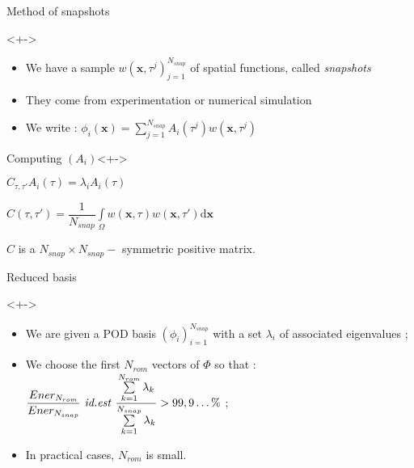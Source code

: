 \begin{frame}{Method of snapshots}
%
\begin{block}{}<+->
\begin{itemize}
\item<+-> We have a sample $w(\mathbf{x},\tau^j)_{j=1}^{N_{snap}}$ of spatial functions, called \emph{snapshots}
\item<+-> They come from experimentation or numerical simulation
\item<+-> We write : $\phi_i(\mathbf{x})=\sum\limits_{j=1}^{N_{snap}}A_i(\tau^j) w(\mathbf{x},\tau^j)$
\end{itemize}
\end{block}
%
\begin{block}{Computing $(A_i)$}<+->%
%
\begin{description}
\item<+-> [Eigenvalue problem] $C_{\tau,\tau'}A_i(\tau)=\lambda_i A_i(\tau)$
\item<+-> [Time-correlation tensor] $C(\tau,\tau ')=\dfrac{1}{N_{snap}}\int\limits_{\Omega} w(\mathbf{x},\tau)w(\mathbf{x},\tau')\text{d}\mathbf{x}$
\item<+-> $C$ is a $N_{snap}\times N_{snap}-$ symmetric positive matrix.
\end{description}
%
\end{block}
%
\end{frame}

\begin{frame}{Reduced basis}
%
\begin{block}{}<+->
\begin{itemize}
\item<+-> We are given a POD basis $(\phi_i)_{i=1}^{N_{snap}}$ with a set $\lambda_i$ of associated eigenvalues ;
\item<+-> We choose the first $N_{rom}$ vectors of $\Phi$ so that : %
$\dfrac{Ener_{N_{rom}}}{Ener_{N_{snap}}}\text{ \textit{id.est} }\dfrac{\sum\limits_{k=1}^{N_{rom}}\lambda_k}{\sum\limits_{k=1}^{N_{snap}}\lambda_k} >99,9\dots \%$ ;
\item<+-> In practical cases, $N_{rom}$ is small.
\end{itemize}
\end{block}
%
\end{frame}


